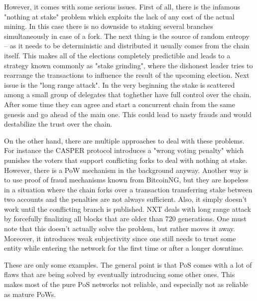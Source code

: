 However, it comes with some serious issues. First of all, there is the infamous "nothing at stake"
\cite{pos_flaws_nothing}
problem which exploits the lack of any cost of the actual mining. In this case
there is no downside to staking several branches simultaneously in case of a fork.
The next thing is the source of random entropy – as it needs to be deterministic
and distributed it usually comes from the chain itself. This
makes all of the elections completely predictible and leads to a strategy known
commonly as "stake grinding", where the dishonest leader tries to rearrange the
transactions to influence the result of the upcoming election. Next issue is the
"long range attack"\cite{pos_flaws_long}.
In the very beginning the stake is scattered among a small
group of delegates that toghether have full control over the chain. After
some time they can agree and start a concurrent chain from the same genesis
and go ahead of the main one. This could lead to nasty frauds and would
destabilize the trust over the chain.

On the other hand, there are multiple approaches to deal with these problems. For instance
the CASPER protocol introduces a "wrong voting penalty" which punishes the
voters that support conflicting forks to deal with nothing at stake\cite{casper}.
However, there is a PoW mechanism in the background anyway. Another way is to use
proof of fraud mechanisms known from BitcoinNG\cite{bcng},
but they are hopeless in a situation where the chain forks over a transaction
transferring stake between two accounts and the penalties are not always
sufficient. Also, it simply doesn't work until the
conflicting branch is published. NXT deals with long range attack by forcefully
finalizing all blocks that are older than 720 generations\cite{nxt}.
One must note that this doesn't actually solve the problem, but rather moves it
away. Moreover, it introduces weak subjectivity since one still needs to trust
some entity while entering the network for the first time or after a longer downtime.

These are only some examples. The general point is that PoS comes with a lot
of flaws that are being solved by eventually introducing some other ones. This
makes most of the pure PoS networks not reliable, and especially not as reliable
as mature PoWs.
